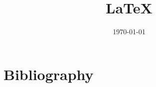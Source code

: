 \documentclass[11pt]{article}
\title{\LaTeX}
\author{}
\date{\today}
\begin{document}
\maketitle
\tableofcontents
\section{Bibliography}
\printbibliography
\end{document}
